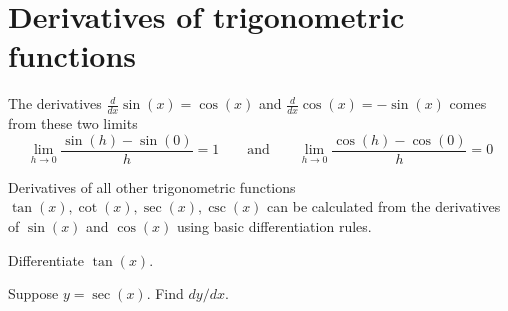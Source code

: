 \documentclass[../main.tex]{subfiles}
\begin{document}
 \section{Derivatives of trigonometric functions}
  The derivatives \(\frac{d}{dx}\sin(x) = \cos(x)\) and \(\frac{d}{dx} \cos(x) = -\sin(x)\) comes from these two limits
  \begin{equation} \label{eq:limits-trigs}
    \lim_{h \to 0} \frac{\sin(h) - \sin(0)}{h} = 1
    \qquad\text{and}\qquad
    \lim_{h \to 0} \frac{\cos(h) - \cos(0)}{h} = 0
  \end{equation}
  \begin{center}
    
    \qquad
    
  \end{center}


  Derivatives of all other trigonometric functions \(\tan(x), \cot(x), \sec(x), \csc(x)\) can be calculated from the derivatives of \(\sin(x)\) and \(\cos(x)\) using basic differentiation rules.
  \begin{example}
    Differentiate \(\tan(x)\).

  \end{example}

  \begin{example}
    Suppose \(y = \sec(x)\). Find \(dy/dx\). 

  \end{example}
\end{document}

